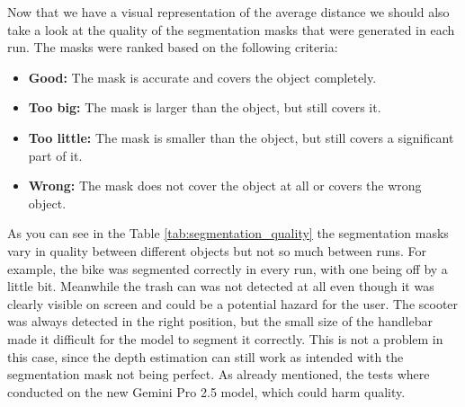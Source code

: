 Now that we have a visual representation of the average distance we should also take a look at the quality of the segmentation masks that were generated in each run.
The masks were ranked based on the following criteria:
\begin{itemize}
    \item \textbf{Good:} The mask is accurate and covers the object completely.
    \item \textbf{Too big:} The mask is larger than the object, but still covers it.
    \item \textbf{Too little:} The mask is smaller than the object, but still covers a significant part of it.
    \item \textbf{Wrong:} The mask does not cover the object at all or covers the wrong object.
\end{itemize}

As you can see in the Table \ref{tab:segmentation_quality} the segmentation masks vary in quality between different objects but not so much between runs.
For example, the bike was segmented correctly in every run, with one being off by a little bit.
Meanwhile the trash can was not detected at all even though it was clearly visible on screen and could be a potential hazard for the user.
The scooter was always detected in the right position, but the small size of the handlebar made it difficult for the model to segment it correctly.
This is not a problem in this case, since the depth estimation can still work as intended with the segmentation mask not being perfect.
As already mentioned, the tests where conducted on the new Gemini Pro 2.5 model, which could harm quality.

\begin{table}[H]
\centering
{}
\caption{Segmentation quality of different objects throughout different runs.}
\label{tab:segmentation_quality}
\end{table}